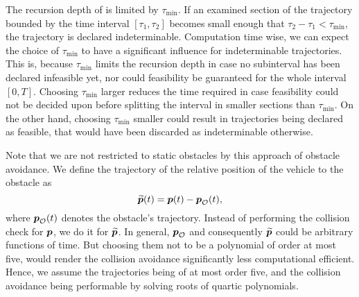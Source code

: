 The recursion depth of  is limited by $\tau_{\min}$.
If an examined section of the trajectory bounded by the time interval $\left[\tau_1, \tau_2\right]$ becomes small enough that $\tau_2 - \tau_1 < \tau_{\min}$, the trajectory is declared indeterminable.
Computation time wise, we can expect the choice of $\tau_{\min}$ to have a significant influence for indeterminable trajectories.
This is, because $\tau_{\min}$ limits the recursion depth in case no subinterval has been declared infeasible yet, nor could feasibility be guaranteed for the whole interval $\left[0, T\right]$.
Choosing $\tau_{\min}$ larger reduces the time required in case feasibility could not be decided upon before splitting the interval in smaller sections than $\tau_{\min}$.
On the other hand, choosing $\tau_{\min}$ smaller could result in trajectories being declared as feasible, that would have been discarded as indeterminable otherwise.

Note that we are not restricted to static obstacles by this approach of obstacle avoidance. We define the trajectory of the relative position of the vehicle to the obstacle as
\begin{equation}
	\mbox{$\widetilde{\bm{p}}$}(t) = \mbox{$\bm{p}$}(t) - \mbox{$\bm{p}$}_{\mathcal{O}}(t)
	,
\end{equation}
where $\mbox{$\bm{p}$}_{\mathcal{O}}(t)$ denotes the obstacle's trajectory. Instead of performing the collision check for $\mbox{$\bm{p}$}$, we do it for $\mbox{$\widetilde{\bm{p}}$}$. In general, $\mbox{$\bm{p}$}_{\mathcal{O}}$ and consequently $\mbox{$\widetilde{\bm{p}}$}$ could be arbitrary functions of time.
But choosing them not to be a polynomial of order at most five, would render the collision avoidance significantly less computational efficient. Hence, we assume the trajectories being of at most order five, and the collision avoidance being performable by solving roots of quartic polynomials.

